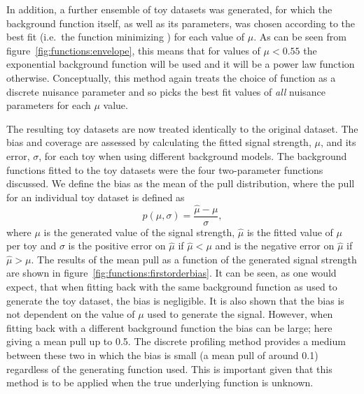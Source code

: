 In addition, a further ensemble of toy datasets was generated, for which the background function itself, as well
as its parameters, was chosen according to the best fit (i.e.~the function minimizing \nll) for each value of $\mu$. 
As can be seen from figure~\ref{fig:functions:envelope}, this means that for values of $\mu < 0.55$ the exponential background
function will be used and it will be a power law function otherwise.
Conceptually, this method again
treats the choice of function as a discrete nuisance parameter and so picks the
best fit values of {\em all\/} nuisance parameters for each $\mu$ value.

The resulting toy datasets are now treated identically to the original dataset. The bias and coverage are assessed by calculating the fitted signal strength, $\mu$, and its error, $\sigma$, for each toy when using different background models. The background functions fitted to the toy datasets were the four two-parameter functions discussed. 
We define the bias as the mean of the pull distribution, where the pull for an individual toy dataset is defined as
\begin{displaymath}
	p(\mu,\sigma) = \frac{\hat{\mu}-\mu}{\sigma},
\end{displaymath}
where $\mu$ is the generated value of the signal strength, $\hat{\mu}$ is the fitted value of $\mu$ per toy and $\sigma$ is the positive error on $\hat{\mu}$ if $\hat{\mu} < \mu$ and is the negative error on $\hat{\mu}$ if $\hat{\mu} > \mu$. The results of the mean pull as a function of the generated signal strength are shown in figure~\ref{fig:functions:firstorderbias}. It can be seen, as one would expect, that when fitting back with the same background function as used to generate the toy dataset, the bias is negligible. It is also shown that the bias is not dependent on the value of $\mu$ used to generate the signal. However, when fitting back with a different background function the bias can be large; here giving a mean pull up to 0.5.
The discrete profiling method provides a medium between these two in which the bias is small (a mean pull of around 0.1) regardless of the generating function used. This is important given that this method is to be applied when the true underlying function is unknown.

